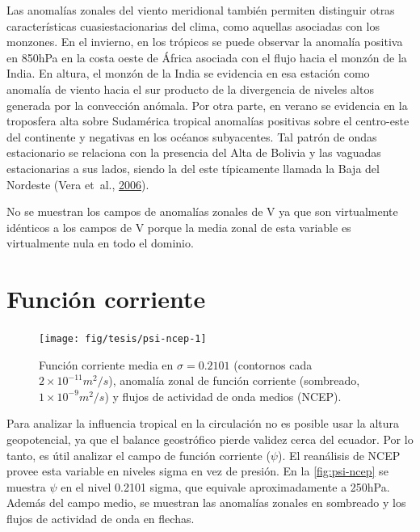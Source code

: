 \documentclass[spanish,a4paper,12pt,oneside]{book}
\begin{document}
Las anomalías zonales del viento meridional también permiten distinguir
otras características cuasiestacionarias del clima, como aquellas
asociadas con los monzones. En el invierno, en los trópicos se puede
observar la anomalía positiva en 850hPa en la costa oeste de África
asociada con el flujo hacia el monzón de la India. En altura, el monzón
de la India se evidencia en esa estación como anomalía de viento hacia
el sur producto de la divergencia de niveles altos generada por la
convección anómala. Por otra parte, en verano se evidencia en la
troposfera alta sobre Sudamérica tropical anomalías positivas sobre el
centro-este del continente y negativas en los océanos subyacentes. Tal
patrón de ondas estacionario se relaciona con la presencia del Alta de
Bolivia y las vaguadas estacionarias a sus lados, siendo la del este
típicamente llamada la Baja del Nordeste (Vera et~al.,
\protect\hyperlink{ref-Vera2006}{2006}).

No se muestran los campos de anomalías zonales de V ya que son
virtualmente idénticos a los campos de V porque la media zonal de esta
variable es virtualmente nula en todo el dominio.

\section{Función corriente}\label{funcion-corriente}

\begin{landscape}\begin{figure}

{\centering \texttt{[image: fig/tesis/psi-ncep-1]} 

}

\caption{Función corriente media en $\sigma = 0.2101$ (contornos cada $2\times10^{-11}m^2/s$), anomalía zonal de función corriente (sombreado,  $1\times10^{-9}m^2/s$) y flujos de actividad de onda medios (NCEP).}\label{fig:psi-ncep}
\end{figure}
\end{landscape}

Para analizar la influencia tropical en la circulación no es posible
usar la altura geopotencial, ya que el balance geostrófico pierde
validez cerca del ecuador. Por lo tanto, es útil analizar el campo de
función corriente (\(\psi\)). El reanálisis de NCEP provee esta variable
en niveles sigma en vez de presión. En la \autoref{fig:psi-ncep} se
muestra \(\psi\) en el nivel 0.2101 sigma, que equivale aproximadamente
a 250hPa. Además del campo medio, se muestran las anomalías zonales en
sombreado y los flujos de actividad de onda en flechas.
\end{document}
